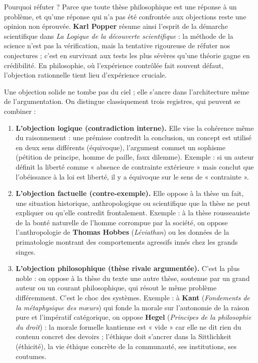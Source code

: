 \documentclass[11pt]{article}
\newcommand{\cle}[1]{{\popxbold\color{popdark}#1}}
\newcounter{popsec}
\newcounter{popsub}
\newcommand{\courssub}[1]{%
  \stepcounter{popsub}%
  \par\vspace{9pt}\noindent{\popxbold\fontsize{11.5}{13}\selectfont\color{popink}{\color{poporange}\thepopsec.\thepopsub}\hspace{6pt}#1}\par\nopagebreak\vspace{4pt}
}
\begin{document}
Pourquoi réfuter ? Parce que toute thèse philosophique est une réponse à un problème, et qu'une réponse qui n'a pas été confrontée aux objections reste une opinion non éprouvée. \textbf{Karl Popper} résume ainsi l'esprit de la démarche scientifique dans \emph{La Logique de la découverte scientifique} : la méthode de la science n'est pas la vérification, mais la tentative rigoureuse de réfuter nos conjectures ; c'est en survivant aux tests les plus sévères qu'une théorie gagne en crédibilité. En philosophie, où l'expérience contrôlée fait souvent défaut, l'objection rationnelle tient lieu d'expérience cruciale.

\courssub{Les trois registres de l'objection}

Une objection solide ne tombe pas du ciel ; elle s'ancre dans l'architecture même de l'argumentation. On distingue classiquement trois registres, qui peuvent se combiner :

\begin{enumerate}
    \item \textbf{L'objection logique (contradiction interne).} Elle vise la cohérence même du raisonnement : une prémisse contredit la conclusion, un concept est utilisé en deux sens différents (équivoque), l'argument commet un sophisme (pétition de principe, homme de paille, faux dilemme). Exemple : si un auteur définit la liberté comme « absence de contrainte extérieure » mais conclut que l'obéissance à la loi est liberté, il y a équivoque sur le sens de « contrainte ».
    \item \textbf{L'objection factuelle (contre-exemple).} Elle oppose à la thèse un fait, une situation historique, anthropologique ou scientifique que la thèse ne peut expliquer ou qu'elle contredit frontalement. Exemple : à la thèse rousseauiste de la bonté naturelle de l'homme corrompue par la société, on oppose l'anthropologie de \textbf{Thomas Hobbes} (\emph{Léviathan}) ou les données de la primatologie montrant des comportements agressifs innés chez les grands singes.
    \item \textbf{L'objection philosophique (thèse rivale argumentée).} C'est la plus noble : on oppose à la thèse du texte une autre thèse, soutenue par un grand auteur ou un courant philosophique, qui résout le même problème différemment. C'est le choc des systèmes. Exemple : à \textbf{Kant} (\emph{Fondements de la métaphysique des mœurs}) qui fonde la morale sur l'autonomie de la raison pure et l'impératif catégorique, on oppose \textbf{Hegel} (\emph{Principes de la philosophie du droit}) : la morale formelle kantienne est « vide » car elle ne dit rien du contenu concret des devoirs ; l'éthique doit s'ancrer dans la \cle{Sittlichkeit} (éthicité), la vie éthique concrète de la communauté, ses institutions, ses coutumes.
\end{enumerate}
\end{document}
